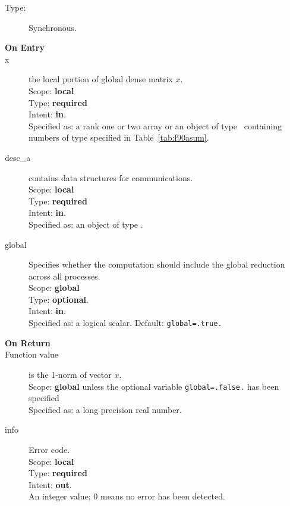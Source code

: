 \begin{description}
\item[Type:] Synchronous.
\item[\bf On Entry]
\item[x] the local portion of global dense matrix
$x$. %
\\
Scope: {\bf local} \\
Type: {\bf required} \\
Intent: {\bf in}.\\
Specified as: a rank one or two array or an object of type \vdata\ 
containing numbers of type specified in
Table~\ref{tab:f90asum}.
\item[desc\_a] contains data structures for communications.\\
Scope: {\bf local} \\
Type: {\bf required}\\
Intent: {\bf in}.\\
Specified as: an object of type \descdata.
\item[global]  Specifies whether the computation should include the
  global reduction across all processes.\\
Scope: {\bf global} \\
Type: {\bf optional}.\\
Intent: {\bf in}.\\
Specified as: a logical scalar.
Default: \verb|global=.true.|\\

\item[\bf On Return] 
\item[Function value] is the 1-norm of vector $x$.\\
Scope: {\bf global} unless the optional variable
\verb|global=.false.| has been specified\\
Specified as: a long precision real  number.
\item[info] Error code.\\
Scope: {\bf local} \\
Type: {\bf required} \\
Intent: {\bf out}.\\
An integer value; 0 means no error has been detected. 
\end{description}

